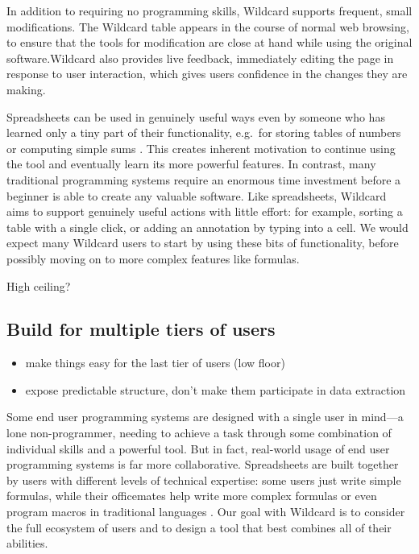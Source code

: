 \documentclass[english,submission]{programming}
\providecommand{\tightlist}{%
  \setlength{\itemsep}{0pt}\setlength{\parskip}{0pt}}
\begin{document}
In addition to requiring no programming skills, Wildcard supports
frequent, small modifications. The Wildcard table appears in the course
of normal web browsing, to ensure that the tools for modification are
close at hand while using the original software.Wildcard also provides
live feedback, immediately editing the page in response to user
interaction, which gives users confidence in the changes they are
making.

Spreadsheets can be used in genuinely useful ways even by someone who
has learned only a tiny part of their functionality, e.g.~for storing
tables of numbers or computing simple sums \autocite{nardi1991}. This
creates inherent motivation to continue using the tool and eventually
learn its more powerful features. In contrast, many traditional
programming systems require an enormous time investment before a
beginner is able to create any valuable software. Like spreadsheets,
Wildcard aims to support genuinely useful actions with little effort:
for example, sorting a table with a single click, or adding an
annotation by typing into a cell. We would expect many Wildcard users to
start by using these bits of functionality, before possibly moving on to
more complex features like formulas.

High ceiling?

\hypertarget{build-for-multiple-tiers-of-users}{%
\subsection{Build for multiple tiers of
users}\label{build-for-multiple-tiers-of-users}}

\begin{itemize}
\tightlist
\item
  make things easy for the last tier of users (low floor)
\item
  expose predictable structure, don't make them participate in data
  extraction
\end{itemize}

Some end user programming systems are designed with a single user in
mind---a lone non-programmer, needing to achieve a task through some
combination of individual skills and a powerful tool. But in fact,
real-world usage of end user programming systems is far more
collaborative. Spreadsheets are built together by users with different
levels of technical expertise: some users just write simple formulas,
while their officemates help write more complex formulas or even program
macros in traditional languages \autocite{nardi1990}. Our goal with
Wildcard is to consider the full ecosystem of users and to design a tool
that best combines all of their abilities.
\end{document}

